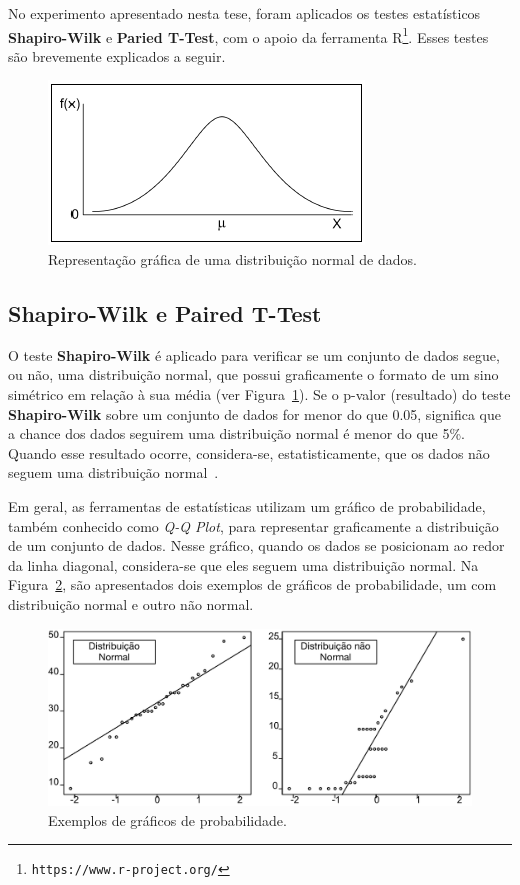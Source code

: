 No experimento apresentado nesta tese, foram aplicados os testes estatísticos \textbf{Shapiro-Wilk} e \textbf{Paried T-Test}, com o apoio da ferramenta R\footnote{\texttt{https://www.r-project.org/}}. Esses testes são brevemente explicados a seguir.%

\begin{figure}[h]
	\centering
	\caption{Representação gráfica de uma distribuição normal de dados.}
	\label{fig:shapiro_wilk}
	\includegraphics[scale=0.9]{images/distribuicao_normal}
	\fautor
\end{figure}

\subsection{Shapiro-Wilk e Paired T-Test}\label{sec:shapiro_wilk}

O teste \textbf{Shapiro-Wilk} é aplicado para verificar se um conjunto de dados segue, ou não, uma distribuição normal, que possui graficamente o formato de um sino simétrico em relação à sua média (ver Figura~\ref{fig:shapiro_wilk}). Se o p-valor (resultado) do teste \textbf{Shapiro-Wilk} sobre um conjunto de dados for menor do que 0.05, significa que a chance dos dados seguirem uma distribuição normal é menor do que 5\%. Quando esse resultado ocorre, considera-se, estatisticamente, que os dados não seguem uma distribuição normal~\cite{Wohlin}. 


Em geral, as ferramentas de estatísticas utilizam um gráfico de probabilidade, também conhecido como \textit{Q-Q Plot}, para representar graficamente a distribuição de um conjunto de dados. Nesse gráfico, quando os dados se posicionam ao redor da linha diagonal, considera-se que eles seguem uma distribuição normal. Na Figura~\ref{fig:qq_plot_exemple}, são apresentados dois exemplos de gráficos de probabilidade, um com distribuição normal e outro não normal.

\begin{figure}[h]
	\centering
	\caption{Exemplos de gráficos de probabilidade.}
	\label{fig:qq_plot_exemple}
	\includegraphics[scale=0.7]{images/qq_plot_exemplo}
	\fautor
\end{figure}

